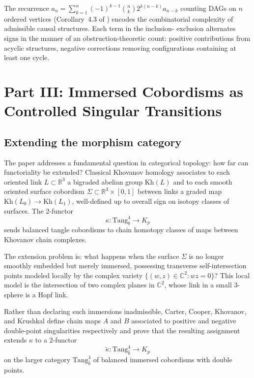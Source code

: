 \documentclass[12pt, a4paper]{article}
\theoremstyle{plain}
\theoremstyle{definition}
\theoremstyle{correspondence}
\newcommand{\RR}{\mathbb{R}}
\newcommand{\Kh}{\mathrm{Kh}}
\newcommand{\Tang}{\mathrm{Tang}}
\begin{document}
The recurrence $a_n = \sum_{k=1}^n (-1)^{k-1} \binom{n}{k} 2^{k(n-k)} a_{n-k}$
counting DAGs on $n$ ordered vertices (Corollary~4.3 of \cite{CIKLR25}) encodes the
combinatorial complexity of admissible causal structures. Each term in the inclusion-
exclusion alternates signs in the manner of an obstruction-theoretic count: positive
contributions from acyclic structures, negative corrections removing configurations
containing at least one cycle.

\section{Part III: Immersed Cobordisms as Controlled Singular Transitions}

\subsection{Extending the morphism category}

The paper \cite{CCKK25} addresses a fundamental question in categorical topology:
how far can functoriality be extended? Classical Khovanov homology associates to each
oriented link $L \subset \RR^3$ a bigraded abelian group $\Kh(L)$ and to each smooth
oriented surface cobordism $\Sigma \subset \RR^3 \times [0,1]$ between links a graded
map $\Kh(L_0) \to \Kh(L_1)$, well-defined up to overall sign on isotopy classes of
surfaces. The 2-functor
\[
\kappa : \Tang^4_b \to K_p
\]
sends balanced tangle cobordisms to chain homotopy classes of maps between Khovanov
chain complexes.

The extension problem is: what happens when the surface $\Sigma$ is no longer smoothly
embedded but merely immersed, possessing transverse self-intersection points modeled
locally by the complex variety $\{(w,z) \in \mathbb{C}^2 : wz = 0\}$? This local model
is the intersection of two complex planes in $\mathbb{C}^2$, whose link in a small
3-sphere is a Hopf link.

Rather than declaring such immersions inadmissible, Carter, Cooper, Khovanov, and
Krushkal define chain maps $A$ and $B$ associated to positive and negative double-point
singularities respectively and prove that the resulting assignment extends $\kappa$
to a 2-functor
\[
\tilde\kappa : \Tang^4_{\hat{b}} \to K_p
\]
on the larger category $\Tang^4_{\hat{b}}$ of balanced immersed cobordisms with double
points.
\end{document}
